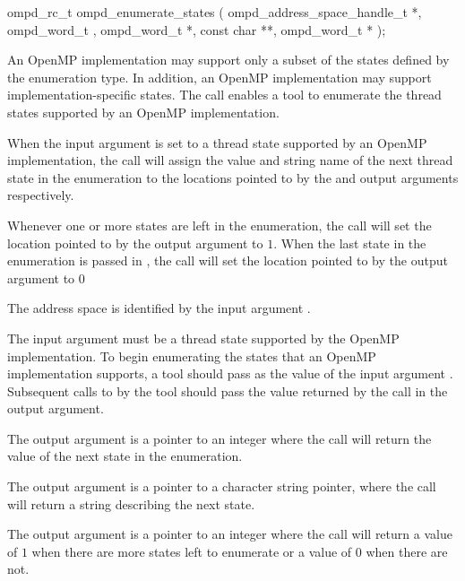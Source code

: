 \format
\begin{cspecific}
\begin{ompSyntax}
ompd_rc_t ompd_enumerate_states (
  ompd_address_space_handle_t *,
  ompd_word_t ,
  ompd_word_t *,
  const char **,
  ompd_word_t *
);
\end{ompSyntax}
\end{cspecific}

\descr
An OpenMP implementation may support only a subset of the states defined by
the  enumeration type. In addition, an
OpenMP implementation may support implementation-specific states.
The  call enables a tool to
enumerate the thread states supported by an OpenMP implementation.

When the  input argument is set to a 
thread state supported by an OpenMP implementation,
the call will assign the value and string name of the next thread state in the enumeration
to the locations pointed to by the 
 and  output arguments respectively.

Whenever one or more states are left in the enumeration,
the call will set the location pointed to by the  
output argument to $1$.
When the last state in the enumeration is passed in , 
the call will set the location pointed to by the  output
argument to $0$


\argdesc

The address space is identified by the input argument .

The input argument  must be a thread state
supported by the OpenMP implementation.  To begin enumerating the
states that an OpenMP implementation supports, a tool should pass
 as the value of the input argument .  Subsequent
calls to  by the tool should pass the
value returned by the call in the  output argument.

The output argument  is a pointer to an integer where
the call will return the value of the next state in the
enumeration.

The output argument  is a pointer to a
character string pointer, where the call will return a string
describing the next state.

The output argument  is a pointer to an integer where
the call will return a value of $1$ when there are more states left to enumerate
or a value of $0$ when there are not.

